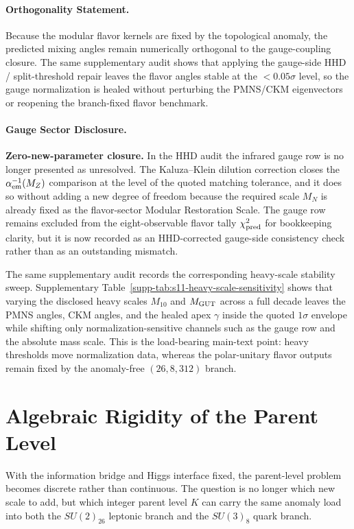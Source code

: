 \documentclass[11pt]{article}
\begin{document}
\paragraph{Orthogonality Statement.}
Because the modular flavor kernels are fixed by the topological anomaly, the predicted mixing angles remain numerically orthogonal to the gauge-coupling closure. The same supplementary audit shows that applying the gauge-side HHD / split-threshold repair leaves the flavor angles stable at the $<0.05\sigma$ level, so the gauge normalization is healed without perturbing the PMNS/CKM eigenvectors or reopening the branch-fixed flavor benchmark.

\paragraph{Gauge Sector Disclosure.}
\textbf{Zero-new-parameter closure.} In the HHD audit the infrared gauge row is no longer presented as unresolved. The Kaluza--Klein dilution correction closes the $\alpha^{-1}_{\rm em}(M_Z)$ comparison at the level of the quoted matching tolerance, and it does so without adding a new degree of freedom because the required scale $M_N$ is already fixed as the flavor-sector Modular Restoration Scale. The gauge row remains excluded from the eight-observable flavor tally $\chi^2_{\rm pred}$ for bookkeeping clarity, but it is now recorded as an HHD-corrected gauge-side consistency check rather than as an outstanding mismatch.

The same supplementary audit records the corresponding heavy-scale stability sweep. Supplementary Table~\ref{supp-tab:s11-heavy-scale-sensitivity} shows that varying the disclosed heavy scales $M_{10}$ and $M_{\rm GUT}$ across a full decade leaves the PMNS angles, CKM angles, and the healed apex $\gamma$ inside the quoted $1\sigma$ envelope while shifting only normalization-sensitive channels such as the gauge row and the absolute mass scale. This is the load-bearing main-text point: heavy thresholds move normalization data, whereas the polar-unitary flavor outputs remain fixed by the anomaly-free $(26,8,312)$ branch.

\section{Algebraic Rigidity of the Parent Level}

With the information bridge and Higgs interface fixed, the parent-level problem becomes discrete rather than continuous. The question is no longer which new scale to add, but which integer parent level $K$ can carry the same anomaly load into both the $SU(2)_{26}$ leptonic branch and the $SU(3)_8$ quark branch.
\end{document}
